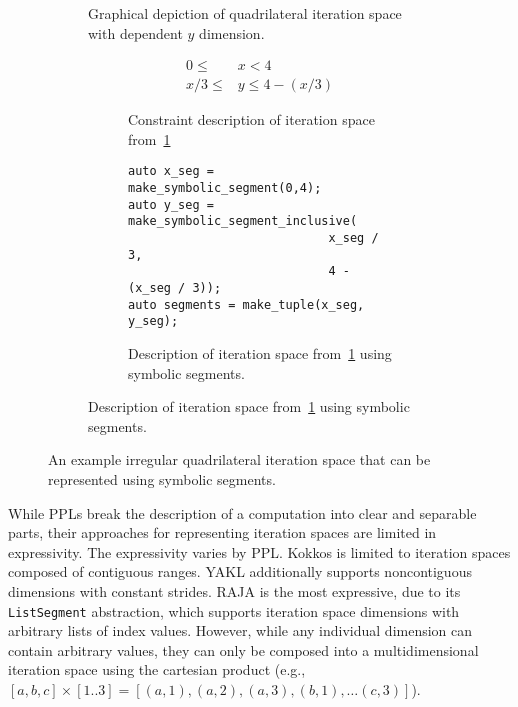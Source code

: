 \begin{figure}
\begin{subfigure}{0.4\columnwidth}
\caption{Graphical depiction of quadrilateral iteration space with dependent $y$ dimension.}\label{trapezoidIterationSpace1}
\end{subfigure}
\hspace{0.05\columnwidth}
\begin{subfigure}{0.55\columnwidth}
\begin{subfigure}{\columnwidth}
\begin{align}
	0 \leq &x < 4 \\
	x / 3 \leq &y \leq 4 - (x / 3)
\end{align}
\caption{Constraint description of iteration space from~\ref{trapezoidIterationSpace1}}\label{trapezoidConstraint1}
\end{subfigure}

\vspace{20pt}

\begin{subfigure}{\columnwidth}
\begin{lstlisting}[]
auto x_seg = make_symbolic_segment(0,4);
auto y_seg = make_symbolic_segment_inclusive(
							x_seg / 3, 
							4 - (x_seg / 3));
auto segments = make_tuple(x_seg, y_seg);
\end{lstlisting}
\caption{Description of iteration space from~\ref{trapezoidIterationSpace1} using symbolic segments.}\label{trapseg1}
\end{subfigure}
\end{subfigure}
\caption{An example irregular quadrilateral iteration space that can be represented using symbolic segments.}\label{trapezoid1}
\end{figure}




While PPLs break the description of a computation into clear and separable parts, their approaches for representing iteration spaces are limited in expressivity.
The expressivity varies by PPL\@.
Kokkos is limited to iteration spaces composed of contiguous ranges.
YAKL additionally supports noncontiguous dimensions with constant strides.
RAJA is the most expressive, due to its \verb.ListSegment. abstraction, which supports iteration space dimensions with arbitrary lists of index values.
However, while any individual dimension can contain arbitrary values, they can only be composed into a multidimensional iteration space using the cartesian product (e.g., $[a, b, c] \times [1..3] = [(a,1), (a,2), (a,3), (b,1), \dots (c,3)]$).

